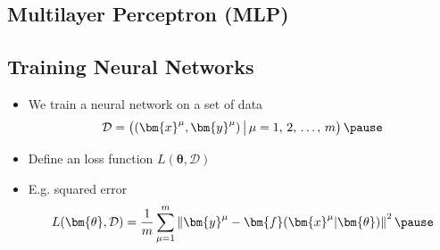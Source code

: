 
\begin{slide}
\section[-2]{Multilayer Perceptron (MLP)}

\pause
\pb
{}
\begin{center}
  \pause
\end{center}
\end{slide}


\begin{slide}
\section{Training Neural Networks}

\begin{PauseHighLight}
  \begin{itemize}
  \item We train a neural network on a set of data
    \begin{align*}
      \mathcal{D} = \left( (\bm{x}^\mu, \bm{y}^\mu) \, \big\vert \, \mu
      = 1,\,2,\, \ldots,\, m\right)\pause
    \end{align*}
  \item Define an loss function $L(\bm{\theta}, \mathcal{D})$\pause
  \item E.g. squared error
    \begin{align*}
      L(\bm{\theta}, \mathcal{D}) = \frac{1}{m}
      \sum_{\mu=1}^m \left\| \bm{y}^\mu -
      \bm{f}(\bm{x}^\mu| \bm{\theta}) \right\|^2\pause
    \end{align*}
  \end{itemize}
\end{PauseHighLight}

\end{slide}



